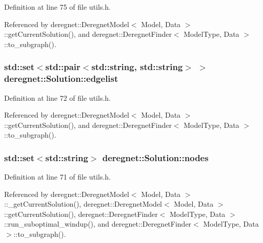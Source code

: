 Definition at line 75 of file utils.\+h.



Referenced by deregnet\+::\+Deregnet\+Model$<$ Model, Data $>$\+::get\+Current\+Solution(), and deregnet\+::\+Deregnet\+Finder$<$ Model\+Type, Data $>$\+::to\+\_\+subgraph().

\subsubsection[{\texorpdfstring{edgelist}{edgelist}}]{\setlength{\rightskip}{0pt plus 5cm}std\+::set$<$std\+::pair$<$std\+::string, std\+::string$>$ $>$ deregnet\+::\+Solution\+::edgelist}\hypertarget{structderegnet_1_1Solution_aa4dcc94d51fa7e4e9443263572d8b18d}{}\label{structderegnet_1_1Solution_aa4dcc94d51fa7e4e9443263572d8b18d}


Definition at line 72 of file utils.\+h.



Referenced by deregnet\+::\+Deregnet\+Model$<$ Model, Data $>$\+::get\+Current\+Solution(), and deregnet\+::\+Deregnet\+Finder$<$ Model\+Type, Data $>$\+::to\+\_\+subgraph().

\subsubsection[{\texorpdfstring{nodes}{nodes}}]{\setlength{\rightskip}{0pt plus 5cm}std\+::set$<$std\+::string$>$ deregnet\+::\+Solution\+::nodes}\hypertarget{structderegnet_1_1Solution_a581de4de354d10149c7b9c0816c70840}{}\label{structderegnet_1_1Solution_a581de4de354d10149c7b9c0816c70840}


Definition at line 71 of file utils.\+h.



Referenced by deregnet\+::\+Deregnet\+Model$<$ Model, Data $>$\+::\+\_\+get\+Current\+Solution(), deregnet\+::\+Deregnet\+Model$<$ Model, Data $>$\+::get\+Current\+Solution(), deregnet\+::\+Deregnet\+Finder$<$ Model\+Type, Data $>$\+::run\+\_\+suboptimal\+\_\+windup(), and deregnet\+::\+Deregnet\+Finder$<$ Model\+Type, Data $>$\+::to\+\_\+subgraph().

